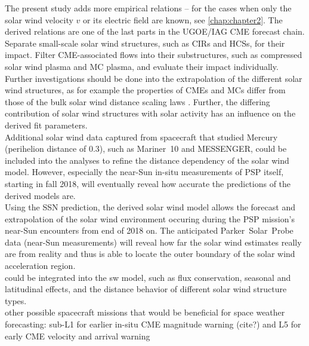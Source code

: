The present study adds more empirical \Kp{} relations -- for the cases when only the solar wind velocity $v$ or its electric field \vBz{} are known, see \autoref{chap:chapter2}. The derived \Kp{} relations are one of the last parts in the UGOE/IAG CME forecast chain.\\

Separate small-scale solar wind structures, such as CIRs and HCSs, for their \Kp{} impact. Filter CME-associated flows into their substructures, such as compressed solar wind plasma and MC plasma, and evaluate their \Kp{} impact individually.\\


Further investigations should be done into the extrapolation of the different solar wind structures, as for example the properties of CMEs and MCs differ from those of the bulk solar wind distance scaling laws \citep{Bothmer1998}. Further, the differing contribution of solar wind structures with solar activity has an influence on the derived fit parameters.\\

Additional solar wind data captured from spacecraft that studied Mercury (perihelion distance of \SI{0.3}{\au}), such as Mariner~10 and MESSENGER, could be included into the analyses to refine the distance dependency of the solar wind model.
However, especially the near-Sun in-situ measurements of PSP itself, starting in fall 2018, will eventually reveal how accurate the predictions of the derived models are.\\

Using the SSN prediction, the derived solar wind model allows the forecast and extrapolation of the solar wind environment occuring during the PSP mission's near-Sun encounters from end of 2018 on. The anticipated Parker~Solar~Probe data (near-Sun measurements) will reveal how far the solar wind estimates really are from reality and thus is able to locate the outer boundary of the solar wind acceleration region.\\

could be integrated into the sw model, such as flux conservation, seasonal and latitudinal effects, and the distance behavior of different solar wind structure types.\\

other possible spacecraft missions that would be beneficial for space weather forecasting: sub-L1 for earlier in-situ CME magnitude warning (cite?) and L5 for early CME velocity and arrival warning \citep{Vourlidas2015}\\


